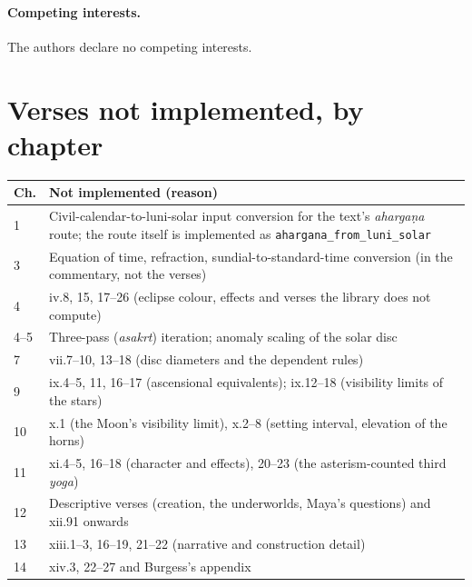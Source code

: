 \documentclass[11pt,a4paper]{article}
\begin{document}
\paragraph{Competing interests.} The authors declare no competing interests.




\appendix
\section{Verses not implemented, by chapter}
\label{app:notdone}

\small
\begin{longtable}{@{}l p{}@{}}
\toprule
Ch. & Not implemented (reason) \\
\midrule
\endhead
1 & Civil-calendar-to-luni-solar input conversion for the text's \textit{aharga\d{n}a} route; the route itself is implemented as \texttt{ahargana\_from\_luni\_solar} \\
3 & Equation of time, refraction, sundial-to-standard-time conversion (in the commentary, not the verses) \\
4 & iv.8, 15, 17--26 (eclipse colour, effects and verses the library does not compute) \\
4--5 & Three-pass (\textit{asakrt}) iteration; anomaly scaling of the solar disc \\
7 & vii.7--10, 13--18 (disc diameters and the dependent rules) \\
9 & ix.4--5, 11, 16--17 (ascensional equivalents); ix.12--18 (visibility limits of the stars) \\
10 & x.1 (the Moon's visibility limit), x.2--8 (setting interval, elevation of the horns) \\
11 & xi.4--5, 16--18 (character and effects), 20--23 (the asterism-counted third \textit{yoga}) \\
12 & Descriptive verses (creation, the underworlds, Maya's questions) and xii.91 onwards \\
13 & xiii.1--3, 16--19, 21--22 (narrative and construction detail) \\
14 & xiv.3, 22--27 and Burgess's appendix \\
\bottomrule
\end{longtable}
\end{document}
